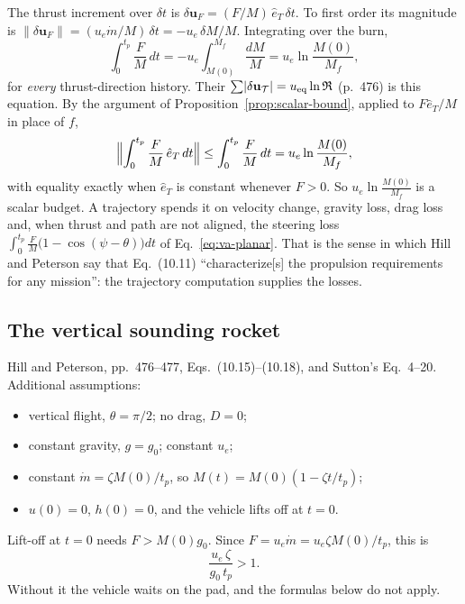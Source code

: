 The thrust increment over $\delta t$ is
$\delta\mathbf u_F=(F/M)\,\hat e_T\,\delta t$. To first order its magnitude
is $\lVert\delta\mathbf u_F\rVert=(u_e\dot m/M)\,\delta t=-u_e\,\delta M/M$.
Integrating over the burn,
\begin{equation}\label{eq:va-thrust-magnitude}
 \int_0^{t_p}\frac{F}{M}\,dt
 =-u_e\int_{M(0)}^{M_f}\frac{dM}{M}
 =u_e\ln\frac{M(0)}{M_f} ,
\end{equation}
for \emph{every} thrust-direction history. Their
$\sum\lvert\delta\mathbf u_{\mathcal T}\rvert=u_{\rm eq}\ln\mathfrak R$
(p.~476) is this equation. By the argument of
Proposition~\ref{prop:scalar-bound}, applied to $F\hat e_T/M$ in place of $f$,
\[
 \Bigl\lVert\int_0^{t_p}\frac{F}{M}\,\hat e_T\,dt\Bigr\rVert
 \le\int_0^{t_p}\frac{F}{M}\,dt
 =u_e\ln\frac{M(0)}{M_f} ,
\]
with equality exactly when $\hat e_T$ is constant whenever $F>0$. So
$u_e\ln\frac{M(0)}{M_f}$ is a scalar budget. A trajectory spends it on
velocity change, gravity loss, drag loss and, when thrust and path are not
aligned, the steering loss
$\int_0^{t_p}\frac{F}{M}\bigl(1-\cos(\psi-\theta)\bigr)dt$ of
Eq.~\ref{eq:va-planar}. That is the sense in which Hill and Peterson say
that Eq.~(10.11) ``characterize[s] the propulsion requirements for any
mission'': the trajectory computation supplies the losses.

\subsection{The vertical sounding rocket}
\label{sec:va-sounding}
Hill and Peterson, pp.~476--477, Eqs.~(10.15)--(10.18), and Sutton's
Eq.~4--20. Additional assumptions:
\begin{itemize}\itemsep1pt
\item vertical flight, $\theta=\pi/2$; no drag, $D=0$;
\item constant gravity, $g=g_0$; constant $u_e$;
\item constant $\dot m=\zeta M(0)/t_p$, so $M(t)=M(0)(1-\zeta t/t_p)$;
\item $u(0)=0$, $h(0)=0$, and the vehicle lifts off at $t=0$.
\end{itemize}
Lift-off at $t=0$ needs $F>M(0)g_0$. Since $F=u_e\dot m=u_e\zeta M(0)/t_p$,
this is
\begin{equation}\label{eq:va-liftoff}
 \frac{u_e\,\zeta}{g_0\,t_p}>1 .
\end{equation}
Without it the vehicle waits on the pad, and the formulas below do not
apply.

